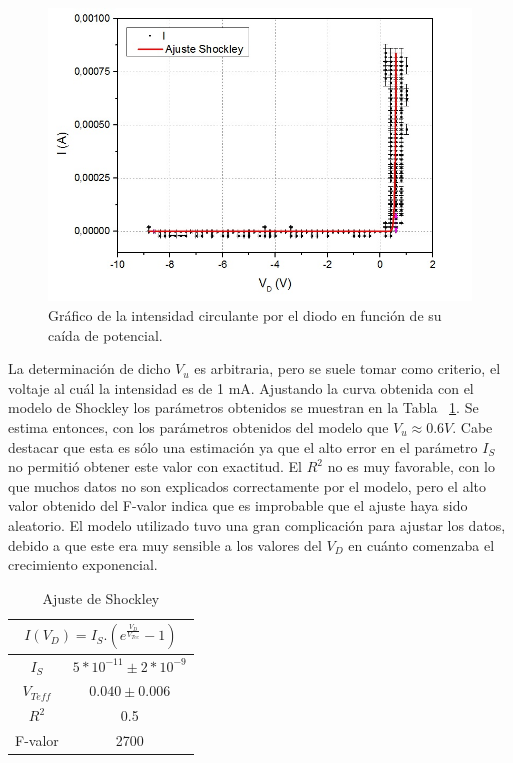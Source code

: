 \documentclass[twoside,twocolumn,a4paper]{article}
\begin{document}
\begin{figure}[h!]
\includegraphics[width=\linewidth]{diodograph.jpg}
\captionsetup{justification=centering}
\caption{Gr\'afico de la intensidad circulante por el diodo en funci\'on de su ca\'ida de potencial.}
\label{fig:diodo_shock}
\end{figure}

La determinaci\'on de dicho $V_u$ es arbitraria, pero se suele tomar como criterio, el voltaje al cu\'al la intensidad es de 1 mA. Ajustando la curva obtenida con el modelo de Shockley los par\'ametros obtenidos se muestran en la Tabla ~\ref{tab:diodo}. Se estima entonces, con los par\'ametros obtenidos del modelo que $V_u\approx0.6V$. Cabe destacar que esta es s\'olo una estimaci\'on ya que el alto error en el par\'ametro $I_S$ no permiti\'o obtener este valor con exactitud. El $R^2$ no es muy favorable, con lo que muchos datos no son explicados correctamente por el modelo, pero el alto valor obtenido del F-valor indica que es improbable que el ajuste haya sido aleatorio. El modelo utilizado tuvo una gran complicaci\'on para ajustar los datos, debido a que este era muy sensible a los valores del $V_D$ en cu\'anto comenzaba el crecimiento exponencial. \par 

\begin{table}[h!]
\centering
\captionsetup{justification=centering}
\caption{Ajuste de Shockley}
\label{tab:diodo}
\begin{tabular}{|c|c|}
\hline
\multicolumn{2}{|c|}{$I(V_D)=I_S . (e^\frac{V_D}{V_{Tee}}-1)$} \\ \hline
$I_S$                       & $5*10^{-11}\pm2*10^{-9}$                   \\ \hline
$V_{Teff}$                  & $0.040\pm0.006$                  \\ \hline
$R^2$                       & 0.5                              \\ \hline
F-valor                     & 2700                             \\ \hline
\end{tabular}
\end{table}
\end{document}
